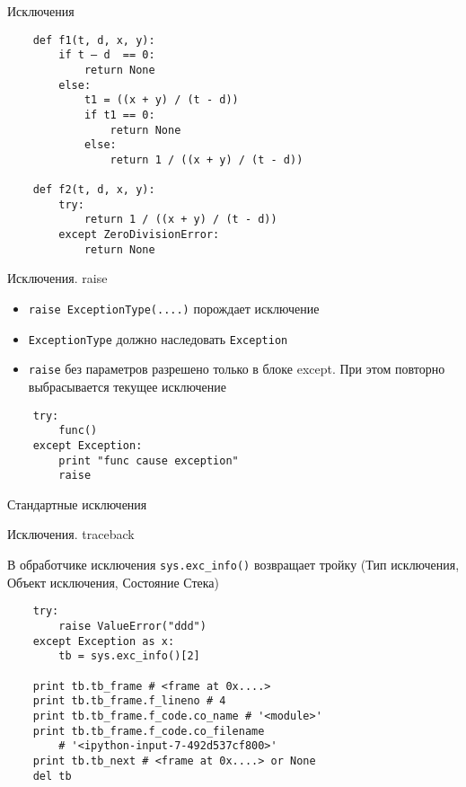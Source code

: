 \documentclass{article}
\begin{document}
\begin{center} Исключения \end{center}
\begin{lstlisting}
	def f1(t, d, x, y):
		if t – d  == 0:
		    return None
		else:
		    t1 = ((x + y) / (t - d))
		    if t1 == 0:
		        return None
		    else:
		        return 1 / ((x + y) / (t - d))

	def f2(t, d, x, y):
		try:
		    return 1 / ((x + y) / (t - d))
		except ZeroDivisionError:
		    return None
\end{lstlisting}
\newpage

\begin{center} Исключения. raise \end{center}
\begin{itemize}
	\item \lstinline!raise ExceptionType(....)! порождает исключение
	\item \lstinline!ExceptionType! должно наследовать \lstinline!Exception!
	\item \lstinline!raise! без параметров разрешено только в блоке except. 
		При этом повторно выбрасывается текущее исключение
\end{itemize}
\begin{lstlisting}
	try:
		func()
	except Exception:
		print "func cause exception"
		raise
\end{lstlisting}
\newpage

\begin{center} Стандартные исключения \end{center}
\newpage

\begin{center} Исключения. traceback \end{center}
	В обработчике исключения \lstinline!sys.exc_info()! возвращает тройку
		(Тип исключения, Объект исключения, Состояние Стека)
\begin{lstlisting}
	try:
	    raise ValueError("ddd")
	except Exception as x:
		tb = sys.exc_info()[2]

	print tb.tb_frame # <frame at 0x....>
	print tb.tb_frame.f_lineno # 4
	print tb.tb_frame.f_code.co_name # '<module>'
	print tb.tb_frame.f_code.co_filename 
		# '<ipython-input-7-492d537cf800>'
	print tb.tb_next # <frame at 0x....> or None
	del tb
\end{lstlisting}
\newpage
\end{document}
